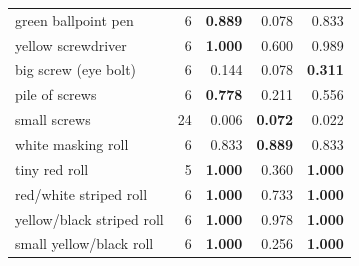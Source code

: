 \begin{table}[H]
\begin{minipage}[t]{.49\textwidth}
\begin{tabular}{lrrrr}
green ballpoint pen & 6 & \textbf{0.889} & 0.078 & 0.833\\
yellow screwdriver & 6 & \textbf{1.000} & 0.600 & 0.989\\
big screw (eye bolt) & 6 & 0.144 & 0.078 & \textbf{0.311}\\
pile of screws & 6 & \textbf{0.778} & 0.211 & 0.556\\
small screws & 24 & 0.006 & \textbf{0.072} & 0.022\\
white masking roll & 6 & 0.833 & \textbf{0.889} & 0.833\\
tiny red roll & 5 & \textbf{1.000} & 0.360 & \textbf{1.000}\\
red/white striped roll & 6 & \textbf{1.000} & 0.733 & \textbf{1.000}\\
yellow/black striped roll & 6 & \textbf{1.000} & 0.978 & \textbf{1.000}\\
small yellow/black roll & 6 & \textbf{1.000} & 0.256 & \textbf{1.000}\\
\bottomrule\end{tabular}\end{minipage}
\par{}
\end{table}
